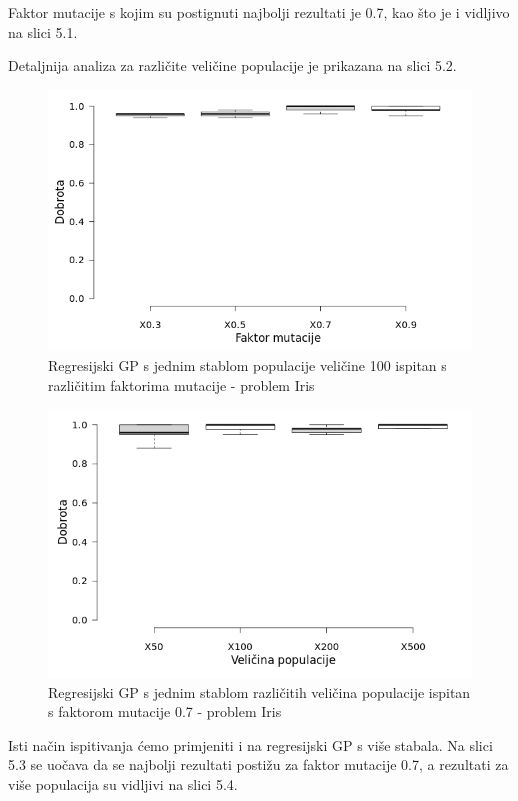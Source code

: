 \documentclass[times, utf8, zavrsni]{fer}
\begin{document}
Faktor mutacije s kojim su postignuti najbolji rezultati je 0.7, kao što je i vidljivo na slici 5.1.

Detaljnija analiza za različite veličine populacije je prikazana na slici 5.2.

\begin{figure}[htb]
\centering
\includegraphics[scale=0.5]{grafovi/boxplotIrisSTest}
\caption{Regresijski GP s jednim stablom populacije veličine 100 ispitan s različitim faktorima mutacije - problem Iris}
\end{figure}

\begin{figure}[htb]
\centering
\includegraphics[scale=0.5]{grafovi/boxplotIrisS}
\caption{Regresijski GP s jednim stablom različitih veličina populacije ispitan s faktorom mutacije 0.7 - problem Iris}
\end{figure}


Isti način ispitivanja ćemo primjeniti i na regresijski GP s više stabala.
Na slici 5.3 se uočava da se najbolji rezultati postižu za faktor mutacije 0.7, a rezultati za više populacija su vidljivi na slici 5.4.
\end{document}
